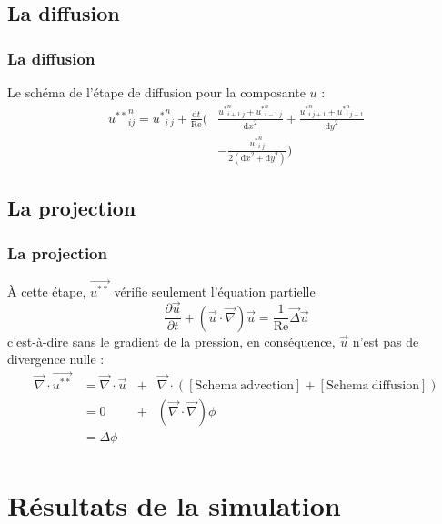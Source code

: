 \documentclass{beamer}
\renewcommand{\d}{\textrm{d}}
\newcommand{\nablaf}{\overrightarrow\nabla}
\begin{document}
  \subsection{La diffusion} 
  \begin{frame}
    \frametitle{La diffusion}
    Le schéma de l'étape de diffusion pour la composante $u$ : 
    \begin{align*}
    {u^{**}}_{i j}^n = {u^*}_{i \ j}^{n} + \frac{\d t}{\mathrm{Re}}
    \Bigg( & \frac{{u^*}_{i+1 \ j}^n + {u^*}_{i-1 \ j}^n}{{\d x}^2}
    + \frac{{u^*}_{i \ j+1}^n + \left.{u^*}_{i \ j-1}^n}{{\d y}^2}\\
    &  -\frac{{u^*}_{i \ j}^{n}}{2({\d x}^2 + {\d y}^2)} \Bigg)
    \end{align*}
  \end{frame}	
  
  \subsection{La projection}
  \begin{frame}
    \frametitle{La projection}
    À cette étape, $\overrightarrow{u^{**}}$ vérifie seulement l'équation partielle
    \[ \frac{\partial\overrightarrow{u}}{\partial t} +
    (\overrightarrow{u} \cdot  \nablaf) \overrightarrow{u} =
    \frac{1}{\mathrm{Re}} \overrightarrow{\Delta} \overrightarrow{u} \]
    c'est-à-dire sans le gradient de la pression, en conséquence,
    $\overrightarrow{u}$ n'est pas de divergence nulle :
    \begin{align*}
      \nablaf \cdot \overrightarrow{u^{**}} & = \nablaf \cdot
      \overrightarrow{u}	& + &\nablaf \cdot ( [\mathrm{Schema 
        \ advection}] + [\mathrm{Schema \ diffusion}])\\ 
      & = 0  &+ & (\nablaf \cdot \nablaf) \phi \\ 
      & = \Delta \phi & & \\
    \end{align*}
  \end{frame}	 
  
\section{Résultats de la simulation}
\end{document}
